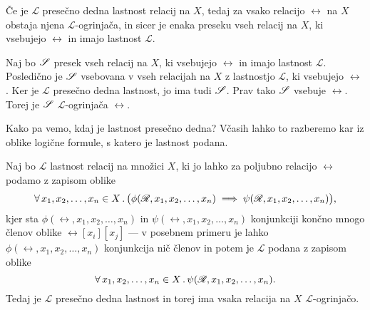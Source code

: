                 \begin{trditev}\label{trditev:obstoj-ogrinjace-iz-presecne-dednosti}
                        Če je $\mathscr{L}$ presečno dedna lastnost relacij na $X$, tedaj za vsako relacijo $\rel$ na $X$ obstaja njena $\mathscr{L}$-ogrinjača, in sicer je enaka preseku vseh relacij na $X$, ki vsebujejo $\rel$ in imajo lastnost $\mathscr{L}$.
                \end{trditev}

                \begin{dokaz}
                        Naj bo $\srel$ presek vseh relacij na $X$, ki vsebujejo $\rel$ in imajo lastnost $\mathscr{L}$. Posledično je $\srel$ vsebovana v vseh relacijah na $X$ z lastnostjo $\mathscr{L}$, ki vsebujejo $\rel$. Ker je $\mathscr{L}$ presečno dedna lastnost, jo ima tudi $\srel$. Prav tako $\srel$ vsebuje $\rel$. Torej je $\srel$ $\mathscr{L}$-ogrinjača $\rel$.
                \end{dokaz}

                Kako pa vemo, kdaj je lastnost presečno dedna? Včasih lahko to razberemo kar iz oblike logične formule, s katero je lastnost podana.

                \begin{izrek}\label{izrek:presecna-dednost-iz-logicne-oblike}
                        Naj bo $\mathscr{L}$ lastnost relacij na množici $X$, ki jo lahko za poljubno relacijo $\rel$ podamo z zapisom oblike
                        \[\all[1]{x_1, x_2, \ldots, x_n}[X]{\phi(\rel, x_1, x_2, \ldots, x_n) \implies \psi(\rel, x_1, x_2, \ldots, x_n)},\]
                        kjer sta $\phi(\rel, x_1, x_2, \ldots, x_n)$ in $\psi(\rel, x_1, x_2, \ldots, x_n)$ konjunkciji končno mnogo členov oblike $\rel[x_i][x_j]$ --- v posebnem primeru je lahko $\phi(\rel, x_1, x_2, \ldots, x_n)$ konjunkcija nič členov in potem je $\mathscr{L}$ podana z zapisom oblike
                        \[\xall{x_1, x_2, \ldots, x_n}[X]{\psi(\rel, x_1, x_2, \ldots, x_n)}.\]
                        Tedaj je $\mathscr{L}$ presečno dedna lastnost in torej ima vsaka relacija na $X$ $\mathscr{L}$-ogrinjačo.
                \end{izrek}

